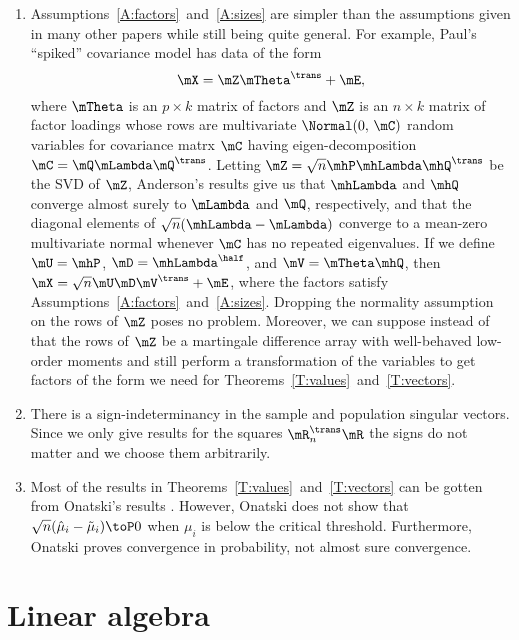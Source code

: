 \begin{enumerate}
    
\item
Assumptions~\ref{A:factors}~and~\ref{A:sizes} are simpler than the assumptions given in many other papers while still being quite general.  For example, Paul's ``spiked'' covariance model has data of the form
\[
    \mX = \mZ \mTheta^\trans + \mE,
\]
where $\mTheta$ is an $p \times k$ matrix of factors and $\mZ$ is an $n\times k$ matrix of factor loadings whose rows are \iid multivariate $\Normal(0,\, \mC)$ random variables for covariance matrx $\mC$ having eigen-decomposition $\mC = \mQ \mLambda \mQ^\trans$.  Letting $\mZ = \sqrt{n} \mhP \mhLambda \mhQ^\trans$ be the SVD of $\mZ$, Anderson's results \cite{anderson1963atp} give us that $\mhLambda$ and $\mhQ$ converge almost surely to $\mLambda$ and $\mQ$, respectively, and that the diagonal elements of $\sqrt{n} (\mhLambda - \mLambda)$ converge to a mean-zero multivariate normal whenever $\mC$ has no repeated eigenvalues.  If we define $\mU = \mhP$, $\mD = \mhLambda^\half$, and $\mV = \mTheta \mhQ$, then $\mX = \sqrt{n} \mU \mD \mV^\trans + \mE$, where the factors satisfy Assumptions~\ref{A:factors}~and~\ref{A:sizes}.  Dropping the normality assumption on the rows of $\mZ$ poses no problem.  Moreover, we can suppose instead of \iid that the rows of $\mZ$ be a martingale difference array with well-behaved low-order moments and still perform a transformation of the variables to get factors of the form we need for Theorems~\ref{T:values}~and~\ref{T:vectors}.

\item
There is a sign-indeterminancy in the sample and population singular vectors. Since we only give results for the squares $\mR_n^\trans \mR$ the signs do not matter and we choose them arbitrarily.

\item 
Most of the results in Theorems~\ref{T:values}~and~\ref{T:vectors} can be gotten from Onatski's results \cite{onatski}.   However, Onatski does not show that $\sqrt{n} (\hat \mu_i - \tilde \mu_i) \toP 0$ when $\mu_i$ is below the critical threshold.  Furthermore, Onatski proves convergence in probability, not almost sure convergence.

\end{enumerate}

\section{Linear algebra}\label{S:linalg}

